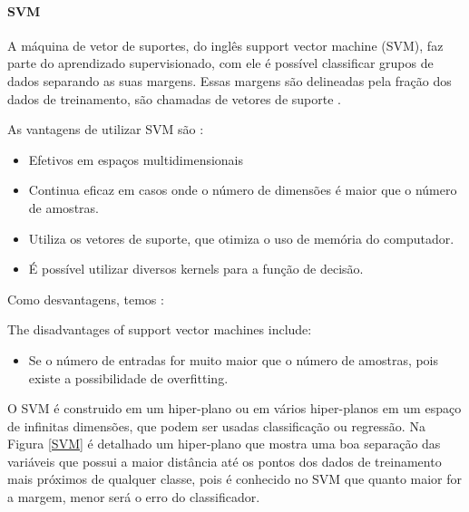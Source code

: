       \paragraph{SVM}

        A máquina de vetor de suportes, do inglês support vector machine (\acrshort{SVM}), faz parte do aprendizado supervisionado, com ele é possível
        classificar grupos de dados separando as suas margens. Essas margens são delineadas pela fração dos dados de treinamento, são chamadas de vetores de suporte \cite{chang2011libsvm}.

        As vantagens de utilizar \acrshort{SVM} são \cite{pedregosa2011scikit}:

        \begin{itemize}

          \item Efetivos em espaços multidimensionais
          \item Continua eficaz em casos onde o número de dimensões é maior que o número de amostras.
          \item Utiliza os vetores de suporte, que otimiza o uso de memória do computador.
          \item É possível utilizar diversos kernels para a função de decisão.

        \end{itemize}

        Como desvantagens, temos \cite{pedregosa2011scikit}:

        The disadvantages of support vector machines include:

        \begin{itemize}

          \item Se o número de entradas for muito maior que o número de amostras, pois existe a possibilidade de overfitting.

        \end{itemize}
        
        O \acrshort{SVM} é construido em um hiper-plano ou em vários hiper-planos em um espaço de infinitas dimensões, que podem ser
        usadas classificação ou regressão. Na Figura \ref{SVM} é detalhado um hiper-plano que mostra uma boa separação das variáveis
        que possui a maior distância até os pontos dos dados de treinamento mais próximos de qualquer classe, pois é conhecido no \acrshort{SVM}
        que quanto maior for a margem, menor será o erro do classificador\cite{vieira2017plantrna_sniffer}. 
        
